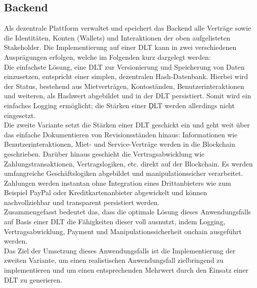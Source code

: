 \subsection{Backend}
\label{subsec:iot_usecase:solution:backend}
Als dezentrale Plattform verwaltet und speichert das Backend alle Verträge sowie die Identitäten, Konten (Wallets) und Interaktionen der oben aufgelisteten Stakeholder. Die Implementierung auf einer \ac{DLT} kann in zwei verschiedenen Ausprägungen erfolgen, welche im Folgenden kurz dargelegt werden:\\
Die einfachste Lösung, eine \ac{DLT} zur Versionierung und Speicherung von Daten einzusetzen, entspricht einer simplen, dezentralen Hash-Datenbank. Hierbei wird der Status, bestehend aus Mietverträgen, Kontoständen, Benutzerinteraktionen und weiteren, als Hashwert abgebildet und in der \ac{DLT} persistiert. Somit wird ein einfaches Logging ermöglicht; die Stärken einer \c{DLT} werden allerdings nicht eingesetzt.\\
Die zweite Variante setzt die Stärken einer \ac{DLT} geschickt ein und geht weit über das einfache Dokumentieren von Revisionsständen hinaus: Informationen wie Benutzerinteraktionen, Miet- und Service-Verträge werden in die Blockchain geschrieben. Darüber hinaus geschieht die Vertragsabwicklung wie Zahlungstransaktionen, Vertragslogiken, etc. direkt auf der Blockchain. Es werden umfangreiche Geschäftslogiken abgebildet und manipulationssicher verarbeitet. Zahlungen werden instantan ohne Integration eines Drittanbieters wie zum Beispiel PayPal oder Kreditkartenanbieter abgewickelt und können nachvollziehbar und transparent persistiert werden.\\
Zusammengefasst bedeutet das, dass die optimale Lösung dieses Anwendungsfalls auf Basis einer \ac{DLT} die Fähigkeiten dieser voll ausnutzt, indem Logging, Vertragsabwicklung, Payment und Manipulationssicherheit onchain ausgeführt werden.\\
Das Ziel der Umsetzung dieses Anwendungsfalls ist die Implementierung der zweiten Variante, um einen realistischen Anwendungsfall zielbringend zu implementieren und um einen entsprechenden Mehrwert durch den Einsatz einer \ac{DLT} zu generieren.

